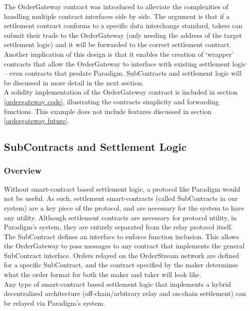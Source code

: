 \documentclass[9pt]{article}
\begin{document}
\noindent The OrderGateway contract was introduced to alleviate the complexities of handling multiple contract interfaces side by side. The argument is that if a settlement contract conforms to a specific data interchange standard, takers can submit their trade to the OrderGateway (only needing the address of the target settlement logic) and it will be forwarded to the correct settlement contract. Another implication of this design is that it enables the creation of ‘wrapper’ contracts that allow the OrderGateway to interface with existing settlement logic – even contracts that predate Paradigm. SubContracts and settlement logic will be discussed in more detail in the next section. \\

\noindent A solidity implementation of the OrderGateway contract is included in section \ref{ordergateway code}, illustrating the contracts simplicity and forwarding functions. This example does not include features discussed in section \ref{ordergateway future}.

\subsection{SubContracts and Settlement Logic}
\subsubsection{Overview}
\noindent Without smart-contract based settlement logic, a protocol like Paradigm would not be useful. As such, settlement smart-contracts (called SubContracts in our system) are a key piece of the protocol, and are necessary for the system to have any utility. Although settlement contracts are necessary for protocol utility, in Paradigm’s system, they are entirely separated from the relay protocol itself. \\ 

\noindent The SubContract defines an interface to enforce function inclusion. This allows the OrderGateway to pass messages to any contract that implements the general SubContract interface. Orders relayed on the OrderStream network are defined for a specific SubContract, and the contract specified by the maker determines what the order format for both the maker and taker will look like. \\ 

\noindent Any type of smart-contract based settlement logic that implements a hybrid decentralized architecture (off-chain/arbitrary relay and on-chain settlement) can be relayed via Paradigm’s system. \\ 
\end{document}

